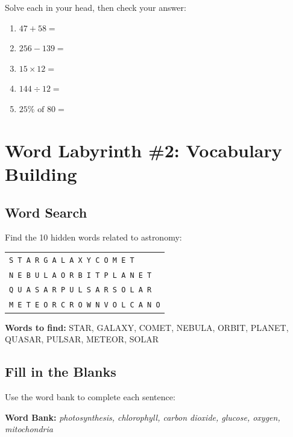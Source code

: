 \documentclass[
    language=english,
    doctype=activity-book,
    institution=none,
]{../../omnilatex}
\begin{document}
Solve each in your head, then check your answer:

\begin{enumerate}
    \item $47 + 58 = \boxed{\phantom{000}}$
    \item $256 - 139 = \boxed{\phantom{000}}$
    \item $15 \times 12 = \boxed{\phantom{000}}$
    \item $144 \div 12 = \boxed{\phantom{000}}$
    \item $25\% \text{ of } 80 = \boxed{\phantom{000}}$
\end{enumerate}

\section{Word Labyrinth \#2: Vocabulary Building}

\subsection{Word Search}

Find the 10 hidden words related to astronomy:

\begin{center}
\begin{tabular}{|l|}
\hline
\texttt{S T A R G A L A X Y C O M E T} \\
\texttt{N E B U L A O R B I T P L A N E T} \\
\texttt{Q U A S A R P U L S A R S O L A R} \\
\texttt{M E T E O R C R O W N V O L C A N O} \\
\hline
\end{tabular}
\end{center}

\textbf{Words to find:} STAR, GALAXY, COMET, NEBULA, ORBIT, PLANET, QUASAR, PULSAR, METEOR, SOLAR

\subsection{Fill in the Blanks}

Use the word bank to complete each sentence:

\textbf{Word Bank:} \textit{photosynthesis, chlorophyll, carbon dioxide, glucose, oxygen, mitochondria}
\end{document}
